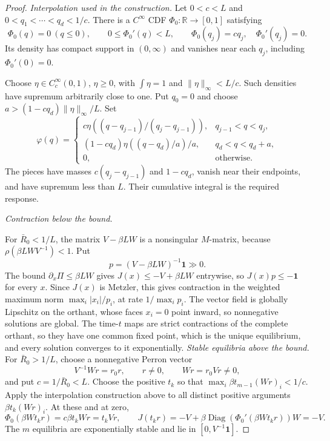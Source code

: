 \begin{proof}
\emph{Interpolation used in the construction.}
Let $0<c<L$ and $0<q_1<\cdots<q_d<1/c$. There is a $C^\infty$ CDF
$\Phi_0:\mathbb R\to[0,1]$ satisfying
\[
 \Phi_0(q)=0\ (q\le0),\qquad 0\le \Phi_0'(q)<L,
 \qquad \Phi_0(q_j)=cq_j,\quad \Phi_0'(q_j)=0.
\]
Its density has compact support in $(0,\infty)$ and vanishes near each
$q_j$, including $\Phi_0'(0)=0$.


Choose $\eta\in C_c^\infty(0,1)$, $\eta\ge0$, with $\int\eta=1$ and
$\|\eta\|_\infty<L/c$. Such densities have supremum arbitrarily close
to one. Put $q_0=0$ and choose $a>(1-cq_d)\|\eta\|_\infty/L$. Set
\[
 \varphi(q)=\begin{cases}
 c\eta((q-q_{j-1})/(q_j-q_{j-1})),&q_{j-1}<q<q_j,\\
 (1-cq_d)\eta((q-q_d)/a)/a,&q_d<q<q_d+a,\\
 0,&\text{otherwise}.
 \end{cases}
\]
The pieces have masses $c(q_j-q_{j-1})$ and $1-cq_d$, vanish near
their endpoints, and have supremum less than $L$. Their cumulative
integral is the required response.

\emph{Contraction below the bound.}

For $\bar R_0<1/L$, the matrix $V-\beta LW$ is a nonsingular $M$-matrix, because
$\rho(\beta LWV^{-1})<1$. Put
\[ p=(V-\beta LW)^{-1}\mathbf1\gg0 .\]
The bound $\partial_x\Pi\le\beta LW$ gives $J(x)\le-V+\beta LW$ entrywise, so
$J(x)p\le-\mathbf1$ for every $x$. Since $J(x)$ is Metzler, this gives contraction
in the weighted maximum norm $\max_i|x_i|/p_i$, at rate $1/\max_ip_i$. The vector field is globally
Lipschitz on the orthant, whose faces $x_i=0$ point inward, so nonnegative solutions are global. The
time-$t$ maps are strict contractions of the complete orthant, so they have one common fixed point,
which is the unique equilibrium, and every solution converges to it exponentially.
\emph{Stable equilibria above the bound.}
For $\bar R_0>1/L$, choose a nonnegative Perron vector
\[
 V^{-1}Wr=r_0r,\qquad r\ne0,\qquad Wr=r_0Vr\ne0,
\]
and put $c=1/\bar R_0<L$. Choose the positive $t_k$ so that
$\max_i\beta t_{m-1}(Wr)_i<1/c$. Apply the interpolation construction above to all distinct positive arguments
$\beta t_k(Wr)_i$. At these and at zero,
\[
 \Phi_0(\beta Wt_kr)=c\beta t_kWr=t_kVr,
 \qquad
 J(t_kr)=-V+\beta\operatorname{Diag}(\Phi_0'(\beta Wt_kr))W=-V.
\]
The $m$ equilibria are exponentially stable and lie in
$[0,V^{-1}\mathbf1]$.


\end{proof}
